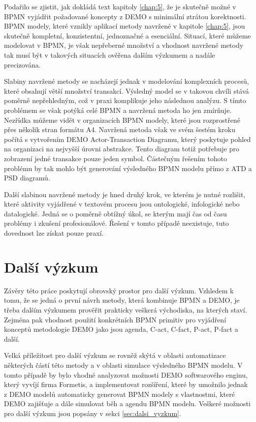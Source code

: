 Podařilo se zjistit, jak dokládá text kapitoly \ref{chap:5}, že je skutečně možné v BPMN vyjádřit požadované koncepty z DEMO s minimální ztrátou korektnosti. BPMN modely, které vznikly aplikací metody navržené v kapitole \ref{chap:5}, jsou skutečně kompletní, konzistentní, jednoznačné a esenciální. Situací, které můžeme modelovat v BPMN, je však nepřeberné množství a vhodnost navržené metody tak musí být v takových situacích ověřena dalším výzkumem a nadále precizována.

Slabiny navržené metody se nacházejí jednak v modelování komplexních procesů, které obsahují větší množství transakcí. Výsledný model se v takovou chvíli stává poměrně nepřehledným, což v praxi komplikuje jeho následnou analýzu. S tímto problémem se však potýká celé BPMN a navržená metoda ho jen zmírňuje. Nezřídka můžeme vidět v organizacích BPMN modely, které jsou rozprostřené přes několik stran formátu A4. Navržená metoda však ve svém šestém kroku počítá s vytvořením DEMO Actor-Transaction Diagramu, který poskytuje pohled na organizaci na nejvyšší úrovni abstrakce. Tento diagram totiž potřebuje pro zobrazení jedné transakce pouze jeden symbol. Částečným řešením tohoto problému by tak mohlo být generování výsledného BPMN modelu přímo z ATD a PSD diagramů.

Další slabinou navržené metody je hned druhý krok, ve kterém je nutné rozlišit, které aktivity vyjádřené v textovém procesu jsou ontologické, infologické nebo datalogické. Jedná se o poměrně obtížný úkol, se kterým mají čas od času problémy i zkušení profesionálové. Řešení v tomto případě neexistuje, tuto dovednost lze získat pouze praxí.

\section{Další výzkum}
Závěry této práce poskytují obrovský prostor pro další výzkum. Vzhledem k tomu, že se jedná o první návrh metody, která kombinuje BPMN a DEMO, je třeba dalším výzkumem prověřit prakticky veškerá východiska, na kterých staví. Zejména pak vhodnost použití konkrétních BPMN primitiv pro vyjádření konceptů metodologie DEMO jako jsou agenda, C-act, C-fact, P-act, P-fact a další.

Velká příležitost pro další výzkum se rovněž skýtá v oblasti automatizace některých částí této metody a v oblasti simulace výsledného BPMN modelu. V tomto případě by bylo vhodné analyzovat možnosti DEMO softwarového enginu, který vyvíjí firma Formetis, a implementovat rozšíření, které by umožnilo jednak z DEMO modelů automaticky generovat BPMN modely s vlastnostmi, které DEMO zajišťuje a dále simulovat běh a agendu BPMN modelu. Veškeré možnosti pro další výzkum jsou popsány v sekci \ref{sec:dalsi_vyzkum}.